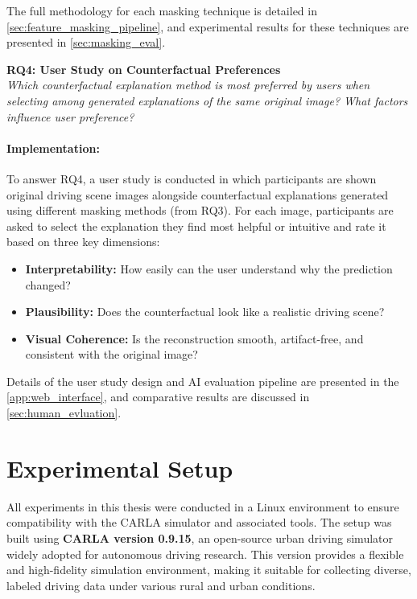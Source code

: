The full methodology for each masking technique is detailed in \cref{sec:feature_masking_pipeline}, and experimental results for these techniques are presented in \cref{sec:masking_eval}.

\vspace{1em}

\textbf{RQ4: User Study on Counterfactual Preferences}  \\
\textit{Which counterfactual explanation method is most preferred by users when selecting among generated explanations of the same original image? What factors influence user preference?}

\vspace{-1em}

\paragraph{Implementation:}To answer RQ4, a user study is conducted in which participants are shown original driving scene images alongside counterfactual explanations generated using different masking methods (from RQ3). For each image, participants are asked to select the explanation they find most helpful or intuitive and rate it based on three key dimensions:

\begin{itemize}
    \item \textbf{Interpretability:} How easily can the user understand why the prediction changed?
    \item \textbf{Plausibility:} Does the counterfactual look like a realistic driving scene?
    \item \textbf{Visual Coherence:} Is the reconstruction smooth, artifact-free, and consistent with the original image?
\end{itemize}

Details of the user study design and AI evaluation pipeline are presented in the \cref{app:web_interface}, and comparative results are discussed in \cref{sec:human_evluation}.

\section{Experimental Setup}

All experiments in this thesis were conducted in a Linux environment to ensure compatibility with the CARLA simulator and associated tools. The setup was built using \textbf{CARLA version 0.9.15}, an open-source urban driving simulator widely adopted for autonomous driving research. This version provides a flexible and high-fidelity simulation environment, making it suitable for collecting diverse, labeled driving data under various rural and urban conditions.

